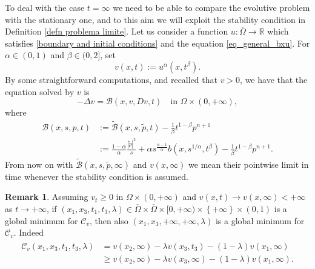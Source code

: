 \documentclass[11pt, reqno]{amsart}
\theoremstyle{definition}
\newtheorem{remark}[lemma]{Remark}
\numberwithin{equation}{section}
\newcommand{\Omegabar}{\overline{\Omega}}
\newcommand{\Btilde}{\widetilde{\mathscr{B}}}
\newcommand{\R}{\mathbb{R}}
\begin{document}
To deal with the case $t=\infty$ we need to be able to compare the evolutive problem with the stationary one, and to this aim we will exploit the stability condition in Definition \ref{defn problema limite}. 
Let us consider a function $u\colon\Omegabar \to \R$ which satisfies \eqref{boundary and initial conditions} and the equation \eqref{eq_general_bxu}. 
	For $\alpha\in(0,1)$ and $\beta \in (0,	2]$, set 
	$$v(x,t):=u^\alpha(x,t^{\beta}) .$$
	By some straightforward computations, and recalled that $v>0$, we have that the equation solved by $v$ is 
\begin{equation}\label{eq_solved_by_v}
 -\Delta v =\mathscr{B} (x,v, Dv, t) \quad\text{in }\Omega\times (0,+\infty), 
 \end{equation}
where 
\begin{equation}\label{defn psi}
	\begin{aligned}
	\mathscr{B}(x,s,p,t) &:= \Btilde(x,s,\tilde{p},t) -\frac{1}{\beta} t^{1-\beta }p^{n+1} \\
	&:= \frac{1-\alpha}{\alpha}\frac{|\tilde{p}|^2}{s}+\alpha s^{\frac{\alpha-1}{\alpha}}b\left(x,s^{1/\alpha}, t^{\beta}\right) -\frac{1}{\beta} t^{1-\beta} p^{n+1}.
	\end{aligned}
\end{equation}
From now on with $\Btilde(x,s,\tilde{p},\infty)$ and $v(x,\infty)$ we mean their pointwise limit in time whenever the stability condition is assumed.

\begin{remark}\label{rem_min_infinf}
Assuming $v_t\geq 0$ in $\Omega \times (0,+\infty)$ and $v(x,t)\to v(x,\infty)<+\infty$ as $t\to+\infty$, if $(x_1,x_3,t_1,t_3,\lambda)\in \Omegabar\times \Omegabar\times [0,+\infty)\times \left\{+\infty\right\}\times (0,1)$ is a global minimum for $\mathcal{C}_v$, then also $(x_1,x_3,+\infty,+\infty,\lambda)$ is a global minimum for $\mathcal{C}_v$. Indeed 
\begin{align*}\begin{split}
		\mathcal{C}_v(x_1,x_3,t_1,t_3,\lambda)&=v(x_2,\infty)-\lambda v(x_3,t_3)-(1-\lambda)v(x_1,\infty)\\
		&\geq v(x_2,\infty)-\lambda v(x_3,\infty)-(1-\lambda)v(x_1,\infty).
	\end{split}
\end{align*}
\end{remark}
\end{document}
